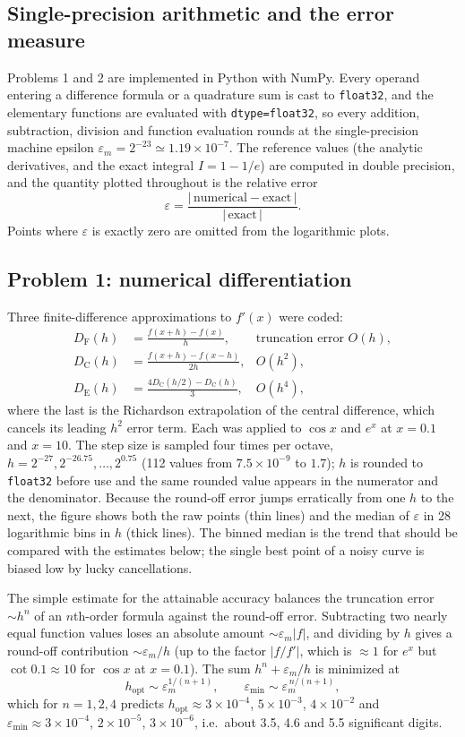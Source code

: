 \documentclass[11pt]{article}
\newcommand{\eps}{\varepsilon}
\newcommand{\epsm}{\varepsilon_m}
\newcommand{\code}[1]{\texttt{#1}}
\begin{document}
\subsection*{Single-precision arithmetic and the error measure}

Problems 1 and 2 are implemented in Python with NumPy. Every operand entering a
difference formula or a quadrature sum is cast to \code{float32}, and the
elementary functions are evaluated with \code{dtype=float32}, so every addition,
subtraction, division and function evaluation rounds at the single-precision
machine epsilon $\epsm = 2^{-23}\simeq1.19\times10^{-7}$. The reference values
(the analytic derivatives, and the exact integral $I = 1-1/e$) are computed in
double precision, and the quantity plotted throughout is the relative error
\[
\eps = \frac{|\,\text{numerical} - \text{exact}\,|}{|\,\text{exact}\,|}.
\]
Points where $\eps$ is exactly zero are omitted from the logarithmic plots.

\subsection*{Problem 1: numerical differentiation}

Three finite-difference approximations to $f'(x)$ were coded:
\begin{align*}
D_{\mathrm{F}}(h) &= \frac{f(x+h)-f(x)}{h}, & \text{truncation error } O(h),\\[2pt]
D_{\mathrm{C}}(h) &= \frac{f(x+h)-f(x-h)}{2h}, & O(h^{2}),\\[2pt]
D_{\mathrm{E}}(h) &= \frac{4D_{\mathrm{C}}(h/2)-D_{\mathrm{C}}(h)}{3}, & O(h^{4}),
\end{align*}
where the last is the Richardson extrapolation of the central difference, which
cancels its leading $h^{2}$ error term. Each was applied to $\cos x$ and $e^{x}$
at $x=0.1$ and $x=10$. The step size is sampled four times per octave,
$h = 2^{-27}, 2^{-26.75}, \dots, 2^{0.75}$ (112 values from
$7.5\times10^{-9}$ to $1.7$); $h$ is rounded to \code{float32} before use and the
same rounded value appears in the numerator and the denominator. Because the
round-off error jumps erratically from one $h$ to the next, the figure shows both
the raw points (thin lines) and the median of $\eps$ in 28 logarithmic bins in
$h$ (thick lines). The binned median is the trend that should be compared with
the estimates below; the single best point of a noisy curve is biased low by
lucky cancellations.

The simple estimate for the attainable accuracy balances the truncation error
$\sim h^{n}$ of an $n$th-order formula against the round-off error. Subtracting
two nearly equal function values loses an absolute amount $\sim\epsm|f|$, and
dividing by $h$ gives a round-off contribution $\sim\epsm/h$ (up to the factor
$|f/f'|$, which is $\approx1$ for $e^{x}$ but $\cot 0.1\approx10$ for $\cos x$ at
$x=0.1$). The sum $h^{n}+\epsm/h$ is minimized at
\[
h_{\mathrm{opt}}\sim\epsm^{1/(n+1)}, \qquad
\eps_{\min}\sim\epsm^{\,n/(n+1)},
\]
which for $n=1,2,4$ predicts $h_{\mathrm{opt}}\approx3\times10^{-4}$,
$5\times10^{-3}$, $4\times10^{-2}$ and $\eps_{\min}\approx3\times10^{-4}$,
$2\times10^{-5}$, $3\times10^{-6}$, i.e.\ about 3.5, 4.6 and 5.5 significant
digits.
\end{document}
